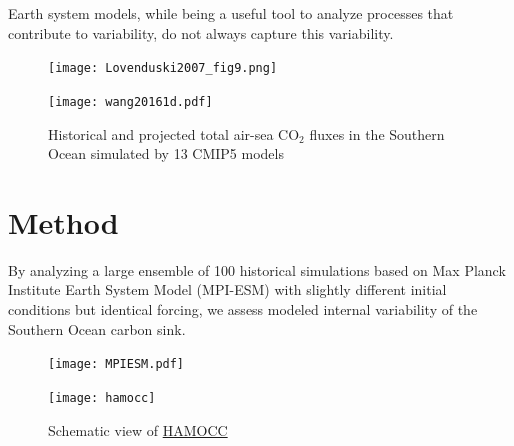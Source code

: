 \documentclass[aspectratio=169]{beamer}
\begin{document}
\begin{frame}{Earth system models, while being a useful tool to analyze processes that contribute to variability, do not always capture this variability.}

\begin{figure}[h]
	\centering
	\begin{minipage}{.45\textwidth}
		\centering
		\texttt{[image: Lovenduski2007\_fig9.png]}
		\caption{Contribution to air-sea CO$_2$ flux anomaly and schematic illustration of the upper ocean response to a positive phase of the SAM \citep{Lovenduski2007}}
		\label{fig:Lovenduski_fig9}
	\end{minipage} \hfill \pause
	\begin{minipage}{.45\textwidth}
		\centering
		\texttt{[image: wang20161d.pdf]} %
		\caption{Historical and projected total air-sea CO$_2$ fluxes in the Southern Ocean simulated by 13 CMIP5 models \citep{Wang2016}}
		\label{fig:Wang_fig1d}
	\end{minipage}
\end{figure}


\end{frame}

	
\section{Method}
\begin{frame}{By analyzing a large ensemble of 100 historical simulations based on Max Planck Institute Earth System Model (MPI-ESM) with slightly different initial conditions but identical forcing, we assess modeled internal variability of the Southern Ocean carbon sink.}

	\begin{figure}
		\centering
		\begin{minipage}{.55\textwidth}
		\texttt{[image: MPIESM.pdf]}
		\caption{Schematic view of MPI-ESM1.1 with prescribed atmospheric pCO$_2$ \citep{Giorgetta2013}}
		\end{minipage} \hfill \pause
		\begin{minipage}{.35\textwidth}
		\texttt{[image: hamocc]}	
		\vspace{-1mm}	
		\caption{Schematic view of \href{https://www.dkrz.de/about/media/galerie/Vis/esm/hamocc}{HAMOCC} \citep{Ilyina2013}}
		\end{minipage}
	\end{figure}
\end{frame}
\end{document}
